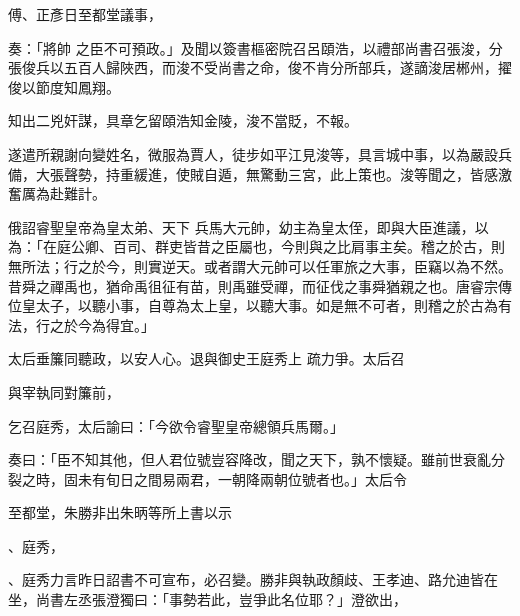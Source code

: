 \begin{pinyinscope}
 傅、正彥日至都堂議事，
 
  
   
  
 
 奏：「將帥
 之臣不可預政。」及聞以簽書樞密院召呂頤浩，以禮部尚書召張浚，分張俊兵以五百人歸陜西，而浚不受尚書之命，俊不肯分所部兵，遂謫浚居郴州，擢俊以節度知鳳翔。
 
  
   
  
 
 知出二兇奸謀，具章乞留頤浩知金陵，浚不當貶，不報。
 
  
   
  
 
 遂遣所親謝向變姓名，微服為賈人，徒步如平江見浚等，具言城中事，以為嚴設兵備，大張聲勢，持重緩進，使賊自遁，無驚動三宮，此上策也。浚等聞之，皆感激奮厲為赴難計。



 俄詔睿聖皇帝為皇太弟、天下
 兵馬大元帥，幼主為皇太侄，即與大臣進議，以為：「在庭公卿、百司、群吏皆昔之臣屬也，今則與之比肩事主矣。稽之於古，則無所法；行之於今，則實逆天。或者謂大元帥可以任軍旅之大事，臣竊以為不然。昔舜之禪禹也，猶命禹徂征有苗，則禹雖受禪，而征伐之事舜猶親之也。唐睿宗傳位皇太子，以聽小事，自尊為太上皇，以聽大事。如是無不可者，則稽之於古為有法，行之於今為得宜。」



 太后垂簾同聽政，以安人心。退與御史王庭秀上
 疏力爭。太后召
 
  
   
  
 
 與宰執同對簾前，
 
  
   
  
 
 乞召庭秀，太后諭曰：「今欲令睿聖皇帝總領兵馬爾。」
 
  
   
  
 
 奏曰：「臣不知其他，但人君位號豈容降改，聞之天下，孰不懷疑。雖前世衰亂分裂之時，固未有旬日之間易兩君，一朝降兩朝位號者也。」太后令
 
  
   
  
 
 至都堂，朱勝非出朱昞等所上書以示
 
  
   
  
 
 、庭秀，
 
  
   
  
 
 、庭秀力言昨日詔書不可宣布，必召變。勝非與執政顏歧、王孝迪、路允迪皆在坐，尚書左丞張澄獨曰：「事勢若此，豈爭此名位耶？」澄欲出，
 

\end{pinyinscope}
